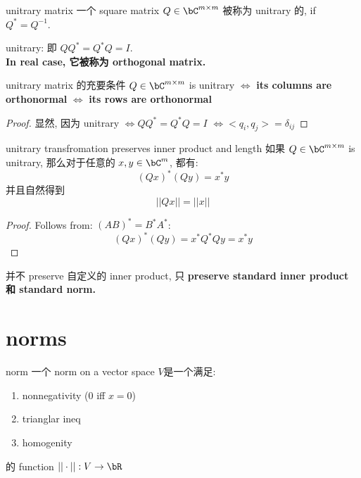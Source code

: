 \documentclass[lang=cn,11pt]{elegantbook}
\begin{document}
\begin{definition}{unitrary matrix}
一个 square matrix $Q \in \bC^{m\times m}$ 被称为 unitrary 的, if $Q^* = Q^{-1}$.
\end{definition}

\begin{remark}
    unitrary: 即 $QQ^* = Q^*Q = I$. \\
    \textbf{In real case, 它被称为 orthogonal matrix.}
\end{remark}


\begin{theorem}{unitrary matrix 的充要条件}
$Q \in \bC^{m\times m}$ is unitrary $\Longleftrightarrow $ \textbf{its columns are orthonormal} $\Longleftrightarrow$ \textbf{its rows are orthonormal} 
\end{theorem}
\begin{proof}
    显然, 因为 unitrary $\Longleftrightarrow QQ^* = Q^*Q = I$ $\Longleftrightarrow  <q_i, q_j> = \delta_{ij}$
\end{proof}



\begin{theorem}{unitrary transfromation preserves inner product and length}
如果 $Q \in \bC^{m\times m}$ is unitrary, 那么对于任意的 $x,y \in \bC^m$, 都有:
$$
(Qx)^* (Qy) = x^*y
$$
并且自然得到 $$||Qx|| = ||x||
$$
\end{theorem}
\begin{proof}
Follows from: $(AB)^*= B^* A^*$:  $$(Qx)^* (Qy) = x^*Q^*Qy= x^*y
$$
\end{proof}
\begin{remark}
    并不 preserve 自定义的 inner product, 只 \textbf{preserve standard inner product 和 standard norm.}
\end{remark}



\chapter{norms}

\begin{definition}{norm}
一个 norm on a vector space $V$是一个满足:
\begin{enumerate}
    \item nonnegativity (0 iff $x=0$)
    \item trianglar ineq
    \item homogenity
\end{enumerate}
的 function $||\cdot||:V \rar \bR$
\end{definition}
\end{document}
